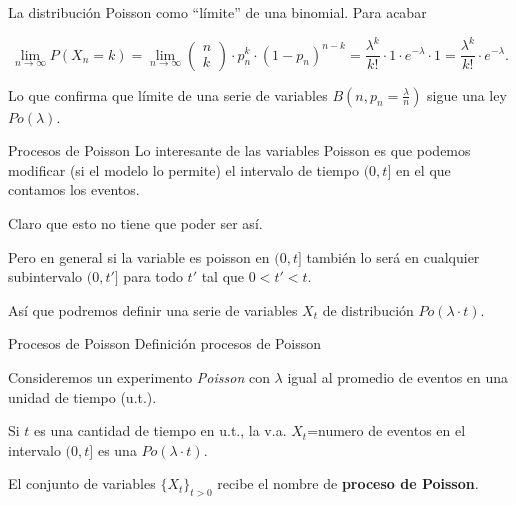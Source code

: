 \documentclass[
  ignorenonframetext,
  aspectratio=169]{beamer}
\begin{document}
\begin{frame}{La distribución Poisson como ``límite'' de una binomial.}
\protect\hypertarget{la-distribuciuxf3n-poisson-como-luxedmite-de-una-binomial.-5}{}
Para acabar

\[
\displaystyle\lim_{n\to\infty} P(X_n=k)=
\lim_{n\to\infty} \left(\begin{array}{c} n\\ k\end{array}\right)
\cdot p_n^k \cdot (1-p_n)^{n-k}= \frac{\lambda^k}{k!}\cdot 1 \cdot e^{-\lambda}\cdot 1=\frac{\lambda^k}{k!}\cdot e^{-\lambda}.
\]

Lo que confirma que límite de una serie de variables
\(B(n,p_n=\frac{\lambda}{n})\) sigue una ley \(Po(\lambda)\).
\end{frame}

\begin{frame}{Procesos de Poisson}
\protect\hypertarget{procesos-de-poisson}{}
Lo interesante de las variables Poisson es que podemos modificar (si el
modelo lo permite) el intervalo de tiempo \((0,t]\) en el que contamos
los eventos.

Claro que esto no tiene que poder ser así.

Pero en general si la variable es poisson en \((0,t]\) también lo será
en cualquier subintervalo \((0,t']\) para todo \(t'\) tal que
\(0<t'<t\).

Así que podremos definir una serie de variables \(X_t\) de distribución
\(Po(\lambda\cdot t)\).
\end{frame}

\begin{frame}{Procesos de Poisson}
\protect\hypertarget{procesos-de-poisson-1}{}
Definición procesos de Poisson

Consideremos un experimento \emph{Poisson} con \(\lambda\) igual al
promedio de eventos en una unidad de tiempo (u.t.).

Si \(t\) es una cantidad de tiempo en u.t., la v.a. \(X_{t}\)=numero de
eventos en el intervalo \((0,t]\) es una \(Po(\lambda\cdot t)\).

El conjunto de variables \(\{X_t\}_{t>0}\) recibe el nombre de
\textbf{proceso de Poisson}.
\end{frame}
\end{document}
